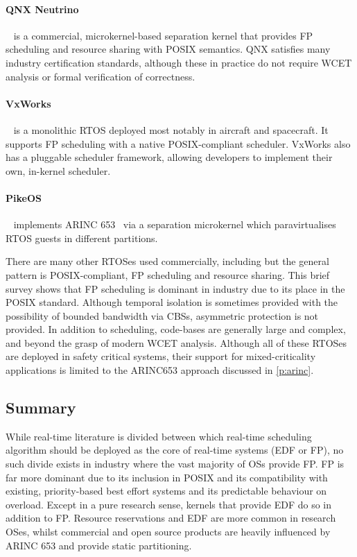 \paragraph{QNX Neutrino}~\citep{QNX_10} is a commercial, microkernel-based separation kernel that provides
\gls{FP} scheduling and resource sharing with POSIX semantics.  QNX satisfies many industry
certification standards, although these in practice do not require {\gls{WCET}} analysis or formal
verification of correctness.

\paragraph{VxWorks}~\citep{VxWorks_08} is a monolithic \gls{RTOS} deployed most notably in aircraft
and spacecraft.  It supports \gls{FP} scheduling with a native POSIX-compliant scheduler.  VxWorks
also has a pluggable scheduler framework, allowing developers to implement their own, in-kernel
scheduler.

\paragraph{PikeOS}~\citep{PikeOS:URL} implements ARINC 653~\citep{ARINC653} via a separation
microkernel which paravirtualises RTOS guests in different partitions.

There are many other \gls{RTOS}es used commercially, including \citet{Deos:URL} but the general pattern is POSIX-compliant, \gls{FP} scheduling and resource sharing.
This brief survey shows that \gls{FP} scheduling is dominant in industry due to its place in the POSIX standard. 
Although temporal isolation is sometimes provided with the possibility of bounded bandwidth via
\glspl{CBS}, asymmetric protection is not provided.  In addition to scheduling, code-bases are
generally large and complex, and beyond the grasp of modern {\gls{WCET}} analysis.  Although all of
these \gls{RTOS}es are deployed in safety critical systems, their support for mixed-criticality
applications is limited to the ARINC653 approach discussed in \cref{p:arinc}. 

\subsection{Summary}

While real-time literature is divided between which real-time scheduling algorithm should be
deployed as the core of real-time systems (\gls{EDF} or \gls{FP}), no such divide exists in industry
where the vast majority of \glspl{OS} provide \gls{FP}.  \gls{FP} is far more dominant due to its
inclusion in \gls{POSIX} and its compatibility with existing, priority-based best effort systems and
its predictable behaviour on overload.  Except in a pure research sense, kernels that provide
\gls{EDF} do so in addition to \gls{FP}.  Resource reservations and \gls{EDF} are more common in
research OSes, whilst commercial and open source products are heavily influenced by ARINC 653 and
provide static partitioning. 
    
